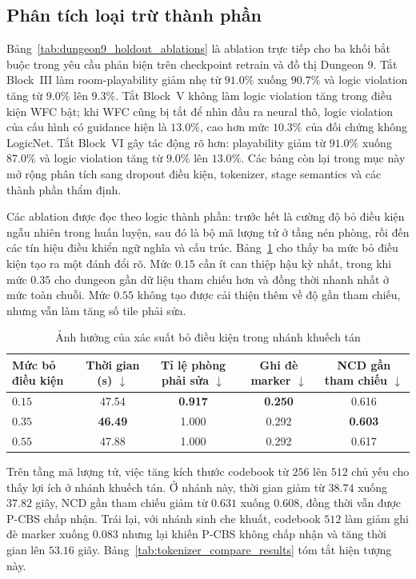 \documentclass[oneside,a4paper,12pt]{extreport}
\begin{document}
\subsection{Phân tích loại trừ thành phần}
Bảng~\ref{tab:dungeon9_holdout_ablations} là ablation trực tiếp cho ba khối bắt buộc trong yêu cầu phản biện trên checkpoint retrain và đồ thị Dungeon $9$. Tắt Block~III làm room-playability giảm nhẹ từ $91.0\%$ xuống $90.7\%$ và logic violation tăng từ $9.0\%$ lên $9.3\%$. Tắt Block~V không làm logic violation tăng trong điều kiện WFC bật; khi WFC cũng bị tắt để nhìn đầu ra neural thô, logic violation của cấu hình có guidance hiện là $13.0\%$, cao hơn mức $10.3\%$ của đối chứng không LogicNet. Tắt Block~VI gây tác động rõ hơn: playability giảm từ $91.0\%$ xuống $87.0\%$ và logic violation tăng từ $9.0\%$ lên $13.0\%$. Các bảng còn lại trong mục này mở rộng phân tích sang dropout điều kiện, tokenizer, stage semantics và các thành phần thẩm định.

Các ablation được đọc theo logic thành phần: trước hết là cường độ bỏ điều kiện ngẫu nhiên trong huấn luyện, sau đó là bộ mã lượng tử ở tầng nén phòng, rồi đến các tín hiệu điều khiển ngữ nghĩa và cấu trúc. Bảng~\ref{tab:pdrop_sweep_results} cho thấy ba mức bỏ điều kiện tạo ra một đánh đổi rõ. Mức $0.15$ cần ít can thiệp hậu kỳ nhất, trong khi mức $0.35$ cho dungeon gần dữ liệu tham chiếu hơn và đồng thời nhanh nhất ở mức toàn chuỗi. Mức $0.55$ không tạo được cải thiện thêm về độ gần tham chiếu, nhưng vẫn làm tăng số tile phải sửa.

\begin{table}[H]
\centering
\small
\setlength{\tabcolsep}{4pt}
\renewcommand{\arraystretch}{1.08}
\caption{Ảnh hưởng của xác suất bỏ điều kiện trong nhánh khuếch tán}
\label{tab:pdrop_sweep_results}
\begin{tabular}{@{}lcccc@{}}
\toprule
Mức bỏ điều kiện & Thời gian (s) $\downarrow$ & Tỉ lệ phòng phải sửa $\downarrow$ & Ghi đè marker $\downarrow$ & NCD gần tham chiếu $\downarrow$ \\
\midrule
$0.15$ & 47.54 & \textbf{0.917} & \textbf{0.250} & 0.616 \\
$0.35$ & \textbf{46.49} & 1.000 & 0.292 & \textbf{0.603} \\
$0.55$ & 47.88 & 1.000 & 0.292 & 0.617 \\
\bottomrule
\end{tabular}
\end{table}

Trên tầng mã lượng tử, việc tăng kích thước codebook từ $256$ lên $512$ chủ yếu cho thấy lợi ích ở nhánh khuếch tán. Ở nhánh này, thời gian giảm từ $38.74$ xuống \textbf{$37.82$} giây, NCD gần tham chiếu giảm từ $0.631$ xuống \textbf{$0.608$}, đồng thời vẫn được P-CBS chấp nhận. Trái lại, với nhánh sinh che khuất, codebook $512$ làm giảm ghi đè marker xuống \textbf{$0.083$} nhưng lại khiến P-CBS không chấp nhận và tăng thời gian lên $53.16$ giây. Bảng~\ref{tab:tokenizer_compare_results} tóm tắt hiện tượng này.
\end{document}

